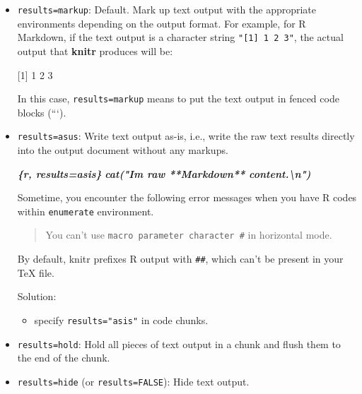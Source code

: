 \documentclass[
  a4paper,
  twoside,
  openright]{book}
\newenvironment{Shaded}{\begin{snugshade}}{\end{snugshade}}
\newcommand{\AttributeTok}[1]{\textcolor[rgb]{0.13,0.29,0.53}{#1}}
\newcommand{\InformationTok}[1]{\textcolor[rgb]{0.56,0.35,0.01}{\textbf{\textit{#1}}}}
\newcommand{\StringTok}[1]{\textcolor[rgb]{0.31,0.60,0.02}{#1}}
\providecommand{\tightlist}{%
  \setlength{\itemsep}{0pt}\setlength{\parskip}{0pt}}
\theoremstyle{definition}
\theoremstyle{definition}
\theoremstyle{definition}
\theoremstyle{definition}
\theoremstyle{remark}
\begin{document}
\begin{itemize}
\item
  \texttt{results=\textquotesingle{}markup\textquotesingle{}}: Default. Mark up text output with the appropriate environments depending on the output format. For example, for R Markdown, if the text output is a character string \texttt{"{[}1{]}\ 1\ 2\ 3"}, the actual output that \textbf{knitr} produces will be:

\begin{Shaded}
\begin{Highlighting}[]
\StringTok{\textasciigrave{}\textasciigrave{}\textasciigrave{}}
\AttributeTok{[1] 1 2 3}
\StringTok{\textasciigrave{}\textasciigrave{}\textasciigrave{}}
\end{Highlighting}
\end{Shaded}

  In this case, \texttt{results=\textquotesingle{}markup\textquotesingle{}} means to put the text output in fenced code blocks (```).
\item
  \texttt{results=\textquotesingle{}asus\textquotesingle{}}: Write text output as-is, i.e., write the raw text results directly into the output document without any markups.

\begin{Shaded}
\begin{Highlighting}[]
\InformationTok{\textasciigrave{}\textasciigrave{}\textasciigrave{}\{r, results=\textquotesingle{}asis\textquotesingle{}\}}
\InformationTok{cat("I\textquotesingle{}m raw **Markdown** content.\textbackslash{}n")}
\InformationTok{\textasciigrave{}\textasciigrave{}\textasciigrave{}}
\end{Highlighting}
\end{Shaded}

  Sometime, you encounter the following error messages when you have R codes within \texttt{enumerate} environment.

  \begin{quote}
  You can't use \texttt{macro\ parameter\ character\ \#} in horizontal mode.
  \end{quote}

  By default, knitr prefixes R output with \texttt{\#\#}, which can't be present in your TeX file.

  Solution:

  \begin{itemize}
  \tightlist
  \item
    specify \texttt{results="asis"} in code chunks.
  \end{itemize}
\item
  \texttt{results=\textquotesingle{}hold\textquotesingle{}}: Hold all pieces of text output in a chunk and flush them to the end of the chunk.
\item
  \texttt{results=\textquotesingle{}hide\textquotesingle{}} (or \texttt{results=\textquotesingle{}FALSE\textquotesingle{}}): Hide text output.
\end{itemize}
\end{document}

